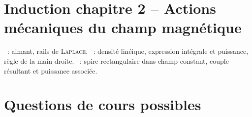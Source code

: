 \documentclass[a4paper, 11pt, final, garamond]{book}
\begin{document}
\section*{Induction chapitre 2 -- Actions mécaniques du champ magnétique}
\begin{enumerate}[label=\Roman*]
	~: aimant, rails de \textsc{Laplace}.
	~: densité linéique, expression intégrale et
	puissance, règle de la main droite.
	~: spire rectangulaire dans champ constant,
	couple résultant et puissance associée.
\end{enumerate}

\section{Questions de cours possibles}
\end{document}
